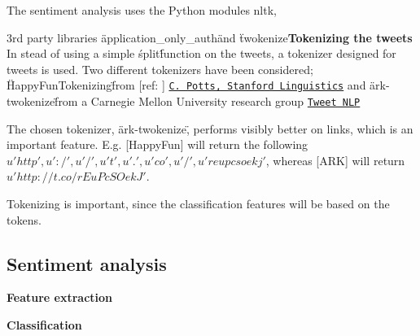 \documentclass[Main]{subfiles}
\begin{document}



The sentiment analysis uses the Python modules nltk, 

3rd party libraries \"application_only_auth\" and \"twokenize\"



\textbf{Tokenizing the tweets}
In stead of using a simple \'split\' function on the tweets, a tokenizer designed for tweets is used. Two different tokenizers have been considered; \"HappyFunTokenizing\" from [ref: ] \href{http://sentiment.christopherpotts.net/tokenizing.html}{\tt C. Potts, Stanford Linguistics} and \"ark-twokenize\" from a Carnegie Mellon University research group \href{http://www.ark.cs.cmu.edu/TweetNLP/}{\tt Tweet NLP}

The chosen tokenizer, \"ark-twokenize\", performs visibly better on links, which is an important feature. E.g. [HappyFun] will return the following ${u'http', u':/', u'/', u't', u'.', u'co', u'/', u'reupcsoekj'}$, whereas [ARK] will return ${u'http://t.co/rEuPcSOekJ'}$. 

Tokenizing is important, since the classification features will be based on the tokens. 



\subsection{Sentiment analysis}

\textbf{Feature extraction}


\textbf{Classification}
\end{document}
